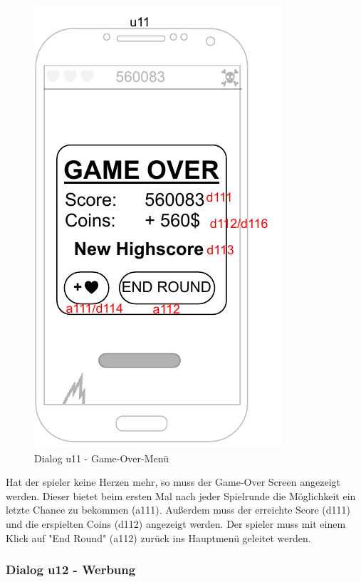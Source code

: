 \begin{figure}
    \begin{center}
    \includegraphics{diagramme/pdf/Mockup-u11.pdf}
    \end{center}
    \caption{Dialog u11 - Game-Over-Menü}
\end{figure}

Hat der \gls{spieler} keine Herzen mehr, so muss der Game-Over Screen angezeigt werden. Dieser bietet beim ersten Mal nach jeder Spielrunde die Möglichkeit ein letzte Chance zu bekommen (a111).
Außerdem muss der erreichte Score (d111) und die erspielten Coins (d112) angezeigt werden.
Der \gls{spieler} muss mit einem Klick auf "End Round" (a112) zurück ins Hauptmenü geleitet werden.
\clearpage

\subsubsection{Dialog u12 - Werbung}

